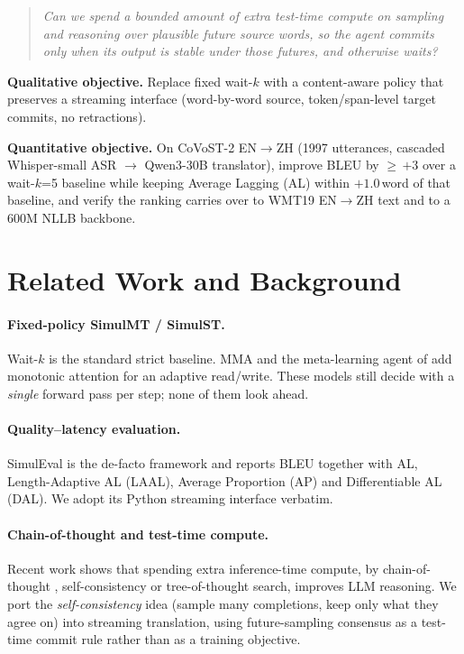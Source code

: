 \documentclass{article}
\begin{document}
\begin{quote}
\emph{Can we spend a bounded amount of extra test-time compute on sampling and reasoning over
plausible \emph{future} source words, so the agent commits only when its output is stable under
those futures, and otherwise waits?}
\end{quote}

\textbf{Qualitative objective.} Replace fixed wait-$k$ with a content-aware policy that preserves
a streaming interface (word-by-word source, token/span-level target commits, no retractions).

\textbf{Quantitative objective.} On CoVoST-2 EN$\rightarrow$ZH (1997 utterances, cascaded
Whisper-small ASR $\rightarrow$ Qwen3-30B translator), improve BLEU by $\geq$\,$+3$ over a
wait-$k$=5 baseline while keeping Average Lagging (AL) within $+1.0$\,word of that baseline, and
verify the ranking carries over to WMT19 EN$\rightarrow$ZH text and to a 600M NLLB backbone.

\section{Related Work and Background}
\label{sec:related}

\paragraph{Fixed-policy SimulMT / SimulST.} Wait-$k$ \citep{ma2019stacl} is the standard strict baseline.
MMA \citep{ma2019monotonic} and the meta-learning agent of \citet{zheng2019simpler} add monotonic
attention for an adaptive read/write. These models still decide with a \emph{single} forward pass
per step; none of them look ahead.

\paragraph{Quality--latency evaluation.} SimulEval \citep{ma2020simuleval} is the de-facto
framework and reports BLEU together with AL, Length-Adaptive AL (LAAL), Average Proportion (AP) and
Differentiable AL (DAL). We adopt its Python streaming interface verbatim.

\paragraph{Chain-of-thought and test-time compute.} Recent work shows that spending extra
inference-time compute, by chain-of-thought \citep{wei2022cot}, self-consistency
\citep{wang2022selfconsistency} or tree-of-thought search, improves LLM reasoning. We port the
\emph{self-consistency} idea (sample many completions, keep only what they agree on) into
streaming translation, using future-sampling consensus as a test-time commit rule rather than as
a training objective.
\end{document}
